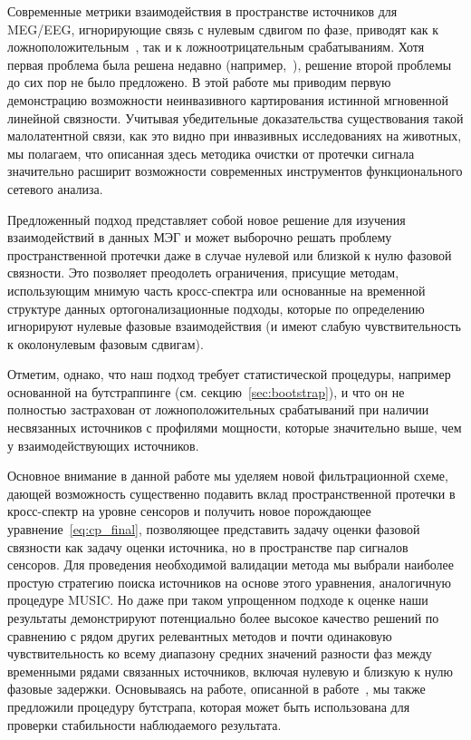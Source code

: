 Современные метрики взаимодействия в пространстве источников для MEG/EEG,
игнорирующие связь с нулевым сдвигом по фазе, приводят как к
ложноположительным~\cite{Palva2018}, так и к ложноотрицательным срабатываниям.
Хотя первая проблема была решена недавно (например,~\cite{Wang2018}), решение
второй проблемы до сих пор не было предложено. В этой работе мы приводим первую
демонстрацию возможности неинвазивного картирования истинной мгновенной
линейной связности.  Учитывая убедительные доказательства существования такой
малолатентной связи, как это видно при инвазивных исследованиях на животных, мы
полагаем, что описанная здесь методика очистки от протечки сигнала значительно
расширит возможности современных инструментов функционального сетевого анализа.


Предложенный подход представляет собой новое решение для изучения
взаимодействий в данных МЭГ и может выборочно решать проблему пространственной
протечки даже в случае нулевой или близкой к нулю фазовой связности. Это
позволяет преодолеть ограничения, присущие методам, использующим мнимую часть
кросс-спектра или основанные на временной структуре данных ортогонализационные
подходы, которые по определению игнорируют нулевые фазовые взаимодействия (и
имеют слабую чувствительность к околонулевым фазовым сдвигам).

Отметим, однако, что наш подход требует статистической процедуры, например
основанной на бутстраппинге (см. секцию~\ref{sec:bootstrap}), и что он не
полностью застрахован от ложноположительных срабатываний при наличии
несвязанных источников с профилями мощности, которые значительно выше, чем у
взаимодействующих источников.

Основное внимание в данной работе мы уделяем новой фильтрационной схеме,
дающей возможность существенно подавить вклад пространственной протечки в кросс-спектр
на уровне сенсоров и получить новое порождающее уравнение~\ref{eq:cp_final},
позволяющее представить задачу оценки фазовой связности как задачу оценки
источника, но в пространстве пар сигналов сенсоров. Для проведения необходимой
валидации метода мы выбрали наиболее простую стратегию поиска источников на
основе этого уравнения, аналогичную процедуре MUSIC. Но даже при таком упрощенном
подходе к оценке наши результаты демонстрируют потенциально более высокое
качество решений по сравнению с рядом других
релевантных методов и почти одинаковую чувствительность ко всему диапазону
средних значений разности фаз между временными рядами связанных источников,
включая нулевую и близкую к нулю фазовые задержки. Основываясь на работе,
описанной в работе~\cite{Darvas2005}, мы также предложили процедуру бутстрапа,
которая может быть использована для проверки стабильности наблюдаемого
результата.

